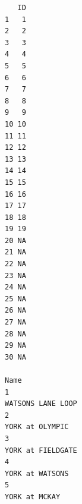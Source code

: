 \documentclass[
11pt, %
oneside, %
english, %
singlespacing, %
]{macthesis} %
\begin{document}
\begin{verbatim}
   ID
1   1
2   2
3   3
4   4
5   5
6   6
7   7
8   8
9   9
10 10
11 11
12 12
13 13
14 14
15 15
16 16
17 17
18 18
19 19
20 NA
21 NA
22 NA
23 NA
24 NA
25 NA
26 NA
27 NA
28 NA
29 NA
30 NA
                                                                                                                                                                                                                                                                                                                                                                                                                             Name
1                                                                                                                                                                                                                                                                                                                                                                                                               WATSONS LANE LOOP
2                                                                                                                                                                                                                                                                                                                                                                                                                 YORK at OLYMPIC
3                                                                                                                                                                                                                                                                                                                                                                                                               YORK at FIELDGATE
4                                                                                                                                                                                                                                                                                                                                                                                                                 YORK at WATSONS
5                                                                                                                                                                                                                                                                                                                                                                                                                   YORK at MCKAY

\end{verbatim}
\end{document}
